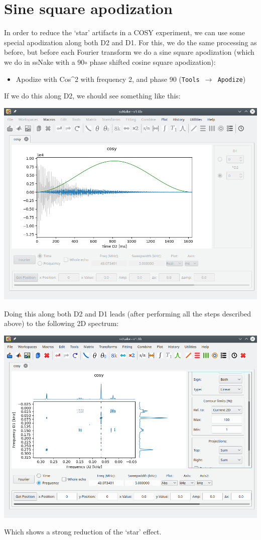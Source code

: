 \documentclass[11pt,a4paper]{article}
\begin{document}
\section{Sine square apodization}
In order to reduce the `star' artifacts in a COSY experiment, we can use some special apodization
along both D2 and D1. For this, we do the same processing as before, but before each Fourier
transform we do a sine square apodization (which we do in ssNake with a 90$\circ$ phase shifted
cosine square apodization):
\begin{itemize}
  \item Apodize with Cos\^{}2 with frequency 2, and phase 90 (\texttt{Tools $\longrightarrow$ Apodize})
\end{itemize}
If we do this along D2, we should see something like this:
\begin{center}
\includegraphics[width=0.8\linewidth]{Figs/Fig6.png}
\end{center}
Doing this along both D2 and D1 leads (after performing all the steps described above) to the
following 2D spectrum:
\begin{center}
\includegraphics[width=0.8\linewidth]{Figs/Fig7.png}
\end{center}
Which shows a strong reduction of the `star' effect.
\end{document}
